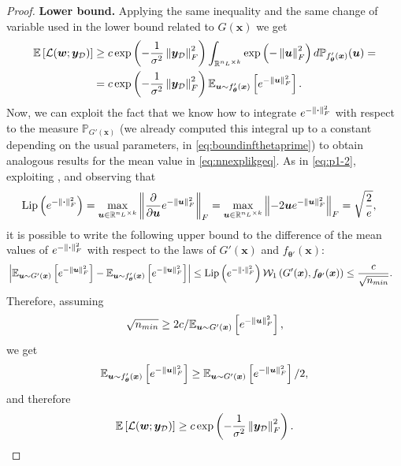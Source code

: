 \begin{proof}
	\textbf{Lower bound.} Applying the same inequality and the same change of variable used in the lower bound related to $G(\bm{x})$ we get 
	\begin{align} \label{eq:nnexplikgeq}
		\mean{\mathcal{L}(\bm{w}; \bm{y}_{\mathcal{D}})} & \geq c \exp{-\frac{1}{\sigma^2} \norm{\bm{y}_{\mathcal{D}}}_F^2} \int_{\real^{n_L \times k}} \exp{-\norm{\bm{u}}_F^2} d \mathbb{P}_{f_{\bm{\theta}}'(\bm{x})}(\bm{u}) \nonumber = \\
		& = c \exp{-\frac{1}{\sigma^2} \norm{\bm{y}_{\mathcal{D}}}_F^2} \mean[\bm{u} \sim f_{\bm{\theta}}'(\bm{x})]{e^{-\norm{\bm{u}}_F^2}}.
	\end{align}
	Now, we can exploit the fact that we know how to integrate $e^{-\norm{\bm{\cdot}}_F^2}$ with respect to the measure $\mathbb{P}_{G'(\bm{x})}$ (we already computed this integral up to a constant depending on the usual parameters, in \cref{eq:boundinfthetaprime}) to obtain analogous results for the mean value in \cref{eq:nnexplikgeq}. 
	As in \cref{eq:p1-2}, exploiting , and observing that
	\begin{align*}
		\lipschitz{e^{-\norm{\bm{\cdot}}_F^2}} & = \max_{\bm{u} \in \real^{n_L \times k}} \norm{\frac{\partial}{\partial \bm{u}} e^{-\norm{\bm{u}}_F^2}}_F = \max_{\bm{u} \in \real^{n_L \times k}} \norm{-2 \bm{u} e^{-\norm{\bm{u}}_F^2}}_F = \sqrt{\frac{2}{e}},
	\end{align*}
	it is possible to write the following upper bound to the difference of the mean values of $e^{-\norm{\bm{\cdot}}_F^2}$ with respect to the laws of $G'(\bm{x})$ and $f_{\bm{\theta}'}(\bm{x})$:
	\begin{equation} \label{eq:boundmeanexpscaled}
		\begin{aligned}
			& \left|\mean[\bm{u} \sim G'(\bm{x})]{e^{-\norm{\bm{u}}_F^2}} - \mean[\bm{u} \sim f_{\bm{\theta}}'(\bm{x})]{e^{-\norm{\bm{u}}_F^2}}\right| \leq \lipschitz{e^{-\norm{\bm{\cdot}}_F^2}} \wass[1]{G'(\bm{x})}{f_{\bm{\theta}'}(\bm{x})} \leq \frac{c}{\sqrt{n_{min}}}.
		\end{aligned}
	\end{equation}
	Therefore, assuming 
	\begin{equation*}
		\sqrt{n_{min}} \geq 2c / \mean[\bm{u} \sim G'(\bm{x})]{e^{-\norm{\bm{u}}_F^2}},
	\end{equation*}
	we get 
	\begin{equation*}
		\mean[\bm{u} \sim f_{\bm{\theta}}'(\bm{x})]{e^{-\norm{\bm{u}}_F^2}} \geq \mean[\bm{u} \sim G'(\bm{x})]{e^{-\norm{\bm{u}}_F^2}} / 2,
	\end{equation*}
	and therefore
	\begin{equation*}
		\mean{\mathcal{L}(\bm{w}; \bm{y}_{\mathcal{D}})} \geq c \exp{-\frac{1}{\sigma^2} \norm{\bm{y}_{\mathcal{D}}}_F^2}.
	\end{equation*}


\end{proof}
